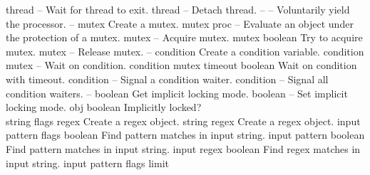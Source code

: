 \begin{longtable}{}
\hline
\optableent
	{thread}
	{{\bf {}}}
	{--}
	{Wait for thread to exit.}
\hline
\optableent
	{thread}
	{{\bf {}}}
	{--}
	{Detach thread.}
\hline
\optableent
	{--}
	{{\bf {}}}
	{--}
	{Voluntarily yield the processor.}
\hline
\optableent
	{--}
	{{\bf {}}}
	{mutex}
	{Create a mutex.}
\hline
\optableent
	{mutex proc}
	{{\bf {}}}
	{--}
	{Evaluate an object under the protection of a mutex.}
\hline
\optableent
	{mutex}
	{{\bf {}}}
	{--}
	{Acquire mutex.}
\hline
\optableent
	{mutex}
	{{\bf {}}}
	{boolean}
	{Try to acquire mutex.}
\hline
\optableent
	{mutex}
	{{\bf {}}}
	{--}
	{Release mutex.}
\hline
\optableent
	{--}
	{{\bf {}}}
	{condition}
	{Create a condition variable.}
\hline
\optableent
	{condition mutex}
	{{\bf {}}}
	{--}
	{Wait on condition.}
\hline
\optableent
	{condition mutex timeout}
	{{\bf {}}}
	{boolean}
	{Wait on condition with timeout.}
\hline
\optableent
	{condition}
	{{\bf {}}}
	{--}
	{Signal a condition waiter.}
\hline
\optableent
	{condition}
	{{\bf {}}}
	{--}
	{Signal all condition waiters.}
\hline
\optableent
	{--}
	{{\bf {}}}
	{boolean}
	{Get implicit locking mode.}
\hline
\optableent
	{boolean}
	{{\bf {}}}
	{--}
	{Set implicit locking mode.}
\hline
\optableent
	{obj}
	{{\bf {}}}
	{boolean}
	{Implicitly locked?}
\hline \hline
{} \\
\hline \hline
\optableent
	{string flags}
	{{\bf {}}}
	{regex}
	{Create a regex object.}
\optableent
	{string}
	{{\bf {}}}
	{regex}
	{Create a regex object.}
\hline
\optableent
	{input pattern flags}
	{{\bf {}}}
	{boolean}
	{Find pattern matches in input string.}
\optableent
	{input pattern}
	{{\bf {}}}
	{boolean}
	{Find pattern matches in input string.}
\optableent
	{input regex}
	{{\bf {}}}
	{boolean}
	{Find regex matches in input string.}
\hline
\optableent
	{input pattern flags limit}
	{{\bf {}}}

\end{longtable}
